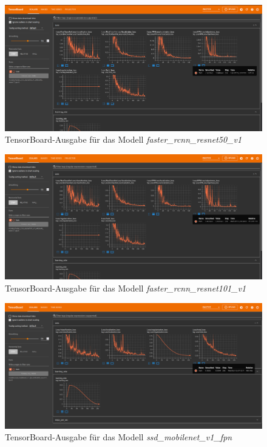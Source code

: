     \begin{figure}[H]
        \centering
        \includegraphics[angle = 90, height = 0.92\textheight]{Bilder/models/model_comparison/tensorboards/faster_rcnn_resnet50_v1_640x640_coco17_tpu-8.png}
        \caption{TensorBoard-Ausgabe für das Modell \textit{faster\_rcnn\_resnet50\_v1}}
        \label{fig:TensorBoard-3}
    \end{figure}
    
    \begin{figure}[H]
        \centering
        \includegraphics[angle = 90, height = 0.92\textheight]{Bilder/models/model_comparison/tensorboards/faster_rcnn_resnet101_v1_640x640_coco17_tpu-8.png}
        \caption{TensorBoard-Ausgabe für das Modell \textit{faster\_rcnn\_resnet101\_v1}}
        \label{fig:TensorBoard-4}
    \end{figure}
    
    \begin{figure}[H]
        \centering
        \includegraphics[angle = 90, height = 0.92\textheight]{Bilder/models/model_comparison/tensorboards/ssd_mobilenet_v1_fpn_640x640_coco17_tpu-8.png}
        \caption{TensorBoard-Ausgabe für das Modell \textit{ssd\_mobilenet\_v1\_fpn}}
        \label{fig:TensorBoard-5}
    \end{figure}
    
